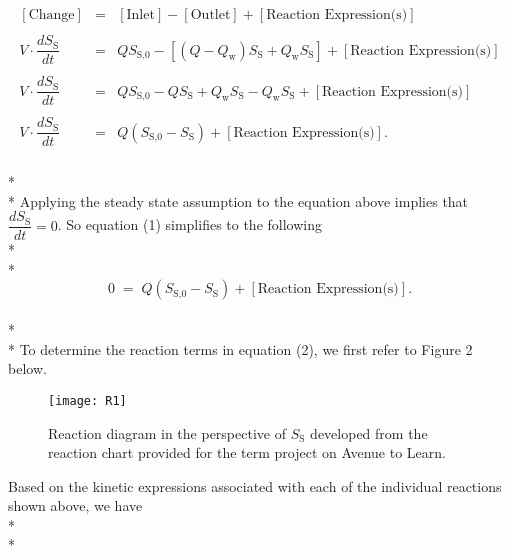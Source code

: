 \documentclass[]{article}
\begin{document}
	\begin{align}
	\begin{array}{rcl}
	[\text{Change}] &=& [\text{Inlet}] - [\text{Outlet}] + [\text{Reaction Expression(s)}] \\ \\
	V \cdot \dfrac{dS_{\text{S}}}{dt} &=& QS_{\text{S,0}} - [(Q-Q_{\text{w}})S_{\text{S}} + Q_{\text{w}}S_{\text{S}}] + [\text{Reaction Expression(s)}] \\ \\
	V \cdot \dfrac{dS_{\text{S}}}{dt} &=& QS_{\text{S,0}} - QS_{\text{S}} + Q_{\text{w}}S_{\text{S}} - Q_{\text{w}}S_{\text{S}} + [\text{Reaction Expression(s)}] \\ \\
	V \cdot \dfrac{dS_{\text{S}}}{dt} &=& Q(S_{\text{S,0}} - S_{\text{S}}) + [\text{Reaction Expression(s)}].
	\end{array}
	\end{align} \\* \\* 
	Applying the steady state assumption to the equation above implies that $\dfrac{dS_{\text{S}}}{dt}=0$. So equation (1) simplifies to the following \\* \\* 
	\begin{equation}
	0 \; = \; Q(S_{\text{S,0}} - S_{\text{S}}) + [\text{Reaction Expression(s)}].
	\end{equation} \\* \\* 
	To determine the reaction terms in equation (2), we first refer to Figure 2 below. 
	\vspace{0.25cm}
	\begin{figure}[H]
		\centering
		\texttt{[image: R1]}
		\caption{Reaction diagram in the perspective of $S_{\text{S}}$ developed from the reaction chart provided for the term project on Avenue to Learn.} 
	\end{figure} 
	\vspace{0.25cm} 
	\noindent Based on the kinetic expressions associated with each of the individual reactions shown above, we have \\* \\* 
\end{document}
